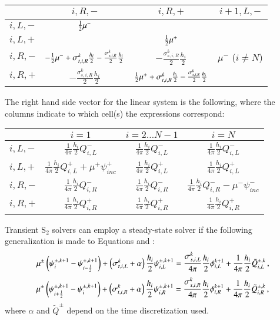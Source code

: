 \documentclass[preprint,12pt]{elsarticle}
\newcommand{\sigsR}{\frac{\sigma_{s,i,R}^k}{2}}
\newcommand{\sigtR}{\sigma_{t,i,R}^k}
\newcommand{\halfh}{\frac{h_i}{2}}
\begin{document}
\begin{center}
\begin{tabular}{|l||c|c|c|}\hline
          & $i,R,-$ & $i,R,+$ & $i+1,L,-$\\\hline\hline
  $i,L,-$ & $\frac{1}{2}\mu^-$
          &
          & \\\hline
  $i,L,+$ &
          & $\frac{1}{2}\mu^+$
          & \\\hline
  $i,R,-$ & $-\half\mu^- + \sigtR\halfh - \sigsR\halfh$
          & $-\sigsR\halfh$
          & $\mu^-$ ($i\ne N$) \\\hline
  $i,R,+$ & $-\sigsR\halfh$
          & $\half\mu^+ + \sigtR\halfh - \sigsR\halfh$
          & \\\hline
\end{tabular}
\end{center}
The right hand side vector for the linear system is the following,
where the columns indicate to which cell(s) the expressions
correspond:

\begin{center}
\begin{tabular}{|l||c|c|c|}\hline
          & $i=1$ & $i=2\ldots N-1$ & $i=N$\\\hline\hline
  $i,L,-$ & $\frac{1}{4\pi}\frac{h_i}{2}Q^-_{i,L}$
          & $\frac{1}{4\pi}\frac{h_i}{2}Q^-_{i,L}$
          & $\frac{1}{4\pi}\frac{h_i}{2}Q^-_{i,L}$ \\\hline
  $i,L,+$ & $\frac{1}{4\pi}\frac{h_i}{2}Q^+_{i,L} + \mu^+\psi^+_{inc}$
          & $\frac{1}{4\pi}\frac{h_i}{2}Q^+_{i,L}$
          & $\frac{1}{4\pi}\frac{h_i}{2}Q^+_{i,L}$ \\\hline
  $i,R,-$ & $\frac{1}{4\pi}\frac{h_i}{2}Q^-_{i,R}$
          & $\frac{1}{4\pi}\frac{h_i}{2}Q^-_{i,R}$
          & $\frac{1}{4\pi}\frac{h_i}{2}Q^-_{i,R} - \mu^-\psi^-_{inc}$ \\\hline
  $i,R,+$ & $\frac{1}{4\pi}\frac{h_i}{2}Q^+_{i,R}$
          & $\frac{1}{4\pi}\frac{h_i}{2}Q^+_{i,R}$
          & $\frac{1}{4\pi}\frac{h_i}{2}Q^+_{i,R}$ \\\hline
\end{tabular}
\end{center}

Transient S$_2$ solvers can employ a steady-state solver if
the following generalization is made to Equations 
and :
\begin{equation}
  \mu^\pm\fn{\psi^{\pm,k+1}_i - \psi^{\pm,k+1}_{i-\half}}
  +\fn{\sigma_{t,i,L}^k + \alpha}\frac{h_i}{2}\psi\iL^{\pm,k+1}=
  \frac{\sigma_{s,i,L}^k}{4\pi}\frac{h_i}{2}\phi\iL^{k+1}
  +\frac{1}{4\pi}\frac{h_i}{2}\tilde{Q}_{i,L}^{\pm,k} \pec
\lequ{S2trL}
\end{equation}
\begin{equation}
  \mu^\pm\fn{\psi^{\pm,k+1}_{i+\half} - \psi^{\pm,k+1}_i}
  +\fn{\sigma_{t,i,R}^k + \alpha}\frac{h_i}{2}\psi\iR^{\pm,k+1}=
  \frac{\sigma_{s,i,R}^k}{4\pi}\frac{h_i}{2}\phi\iR^{k+1}
  +\frac{1}{4\pi}\frac{h_i}{2}\tilde{Q}_{i,R}^{\pm,k} \pec
\lequ{S2trR}
\end{equation}
where $\alpha$ and $\tilde{Q}^\pm$ depend on the time discretization used.
\end{document}
